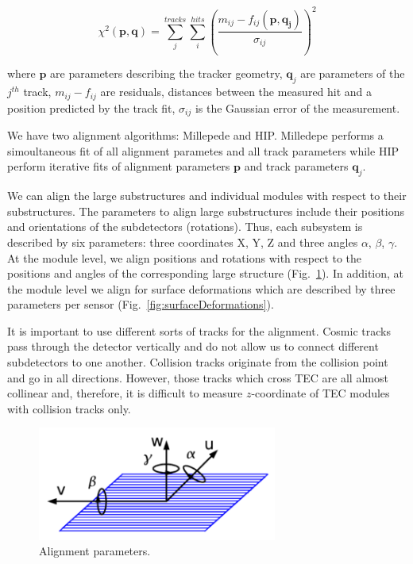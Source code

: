 \begin{equation}
  \chi^2(\mathbf{p},\mathbf{q})=\sum_j^{tracks} \sum_i^{hits} ({\frac{m_{ij}-f_{ij}(\mathbf{p},\mathbf{q_j})}{\sigma_{ij}}})^2
\end{equation}

where $\mathbf{p}$ are parameters describing the tracker geometry, $\mathbf{q}_j$ are parameters of the $j^{th}$ track, $m_{ij}-f_{ij}$ are residuals, distances between the measured hit and a position predicted by the track fit, $\sigma_{ij}$ is the Gaussian error of the measurement.

We have two alignment algorithms: Millepede and HIP. Milledepe performs a simoultaneous fit of all alignment parametes and all track parameters while HIP perform iterative fits of alignment parameters $\mathbf{p}$ and track parameters $\mathbf{q}_j$.

We can align the large substructures and individual modules with respect to their substructures. The parameters to align large substructures include their positions and orientations of the subdetectors (rotations). Thus, each subsystem is described by six parameters: three coordinates X, Y, Z and three angles $\alpha$, $\beta$, $\gamma$. At the module level, we align positions and rotations with respect to the positions and angles of the corresponding large structure (Fig.~\ref{fig:alignmentParameters}). In addition, at the module level we align for surface deformations which are described by three parameters per sensor (Fig.~\ref{fig:surfaceDeformations}). 

It is important to use different sorts of tracks for the alignment. Cosmic tracks pass through the detector vertically and do not allow us to connect different subdetectors to one another. Collision tracks originate from the collision point and go in all directions. However, those tracks which cross TEC are all almost collinear and, therefore, it is difficult to measure $z$-coordinate of TEC modules with collision tracks only.

\begin{figure}[htb]
    \begin{center}
        \includegraphics[width=0.70\textwidth]{../figs/Alignment/alignment_strip_coords.png}
    \end{center}
    \caption{Alignment parameters.}
    \label{fig:alignmentParameters}
\end{figure}

